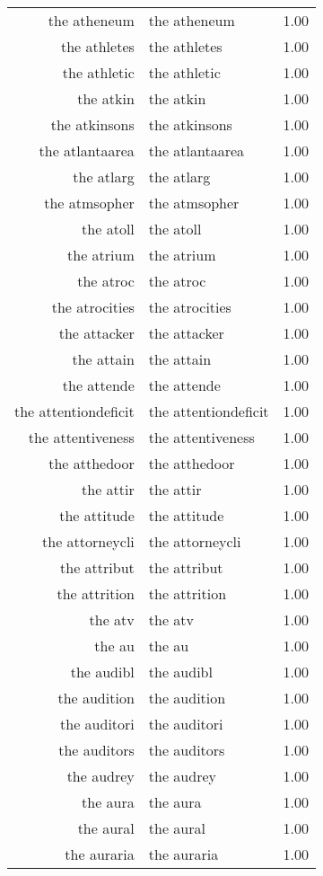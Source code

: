 \begin{table}[ht]
\begin{tabular}{rlr}
  the atheneum & the atheneum & 1.00 \\ 
  the athletes & the athletes & 1.00 \\ 
  the athletic & the athletic & 1.00 \\ 
  the atkin & the atkin & 1.00 \\ 
  the atkinsons & the atkinsons & 1.00 \\ 
  the atlantaarea & the atlantaarea & 1.00 \\ 
  the atlarg & the atlarg & 1.00 \\ 
  the atmsopher & the atmsopher & 1.00 \\ 
  the atoll & the atoll & 1.00 \\ 
  the atrium & the atrium & 1.00 \\ 
  the atroc & the atroc & 1.00 \\ 
  the atrocities & the atrocities & 1.00 \\ 
  the attacker & the attacker & 1.00 \\ 
  the attain & the attain & 1.00 \\ 
  the attende & the attende & 1.00 \\ 
  the attentiondeficit & the attentiondeficit & 1.00 \\ 
  the attentiveness & the attentiveness & 1.00 \\ 
  the atthedoor & the atthedoor & 1.00 \\ 
  the attir & the attir & 1.00 \\ 
  the attitude & the attitude & 1.00 \\ 
  the attorneycli & the attorneycli & 1.00 \\ 
  the attribut & the attribut & 1.00 \\ 
  the attrition & the attrition & 1.00 \\ 
  the atv & the atv & 1.00 \\ 
  the au & the au & 1.00 \\ 
  the audibl & the audibl & 1.00 \\ 
  the audition & the audition & 1.00 \\ 
  the auditori & the auditori & 1.00 \\ 
  the auditors & the auditors & 1.00 \\ 
  the audrey & the audrey & 1.00 \\ 
  the aura & the aura & 1.00 \\ 
  the aural & the aural & 1.00 \\ 
  the auraria & the auraria & 1.00 \\ 

\end{tabular}
\end{table}
